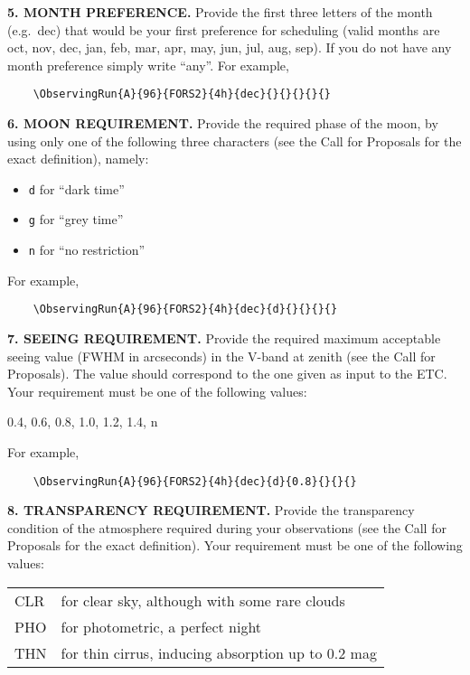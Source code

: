 \documentclass{article}
\begin{document}
\medskip

{\bf 5. MONTH PREFERENCE.} Provide the first three letters of the
month (e.g.\ dec) that would be your first preference for
scheduling (valid months are 
oct, nov, dec, jan,
feb, mar, apr, may,
jun, jul, aug, sep).
If you do not have any month preference simply
write ``any''. For example,
\begin{verbatim}
    \ObservingRun{A}{96}{FORS2}{4h}{dec}{}{}{}{}{}
\end{verbatim}

\medskip

{\bf 6. MOON REQUIREMENT.} Provide the required phase of the moon, by
using only one of the following three characters (see the Call for
Proposals for the exact definition), namely:
\begin{itemize}
\item {\tt d} for ``dark time''
\item {\tt g} for ``grey time''
\item {\tt n} for ``no restriction''
\end{itemize}
For example,
\begin{verbatim}
    \ObservingRun{A}{96}{FORS2}{4h}{dec}{d}{}{}{}{}
\end{verbatim}

\medskip


{\bf 7. SEEING REQUIREMENT.} Provide the required maximum acceptable seeing value (FWHM in arcseconds) in the V-band at zenith (see the Call for Proposals). The value should correspond to the one given as input to the ETC.  Your requirement must be one of the following values:

\smallskip

0.4, 0.6, 0.8, 1.0, 1.2, 1.4, n

\smallskip

For example,
\begin{verbatim}
    \ObservingRun{A}{96}{FORS2}{4h}{dec}{d}{0.8}{}{}{}
\end{verbatim}

\medskip

{\bf 8. TRANSPARENCY REQUIREMENT.} Provide the transparency
condition of the atmosphere required during your observations (see the
Call for Proposals for the exact definition). Your requirement must
be one of the following values:

\smallskip

\begin{tabular}{ll}
  CLR & for clear sky, although with some rare clouds \\
  PHO & for photometric, a perfect night \\
  THN & for thin cirrus, inducing absorption up to 0.2 mag \\
\end{tabular}
\end{document}

